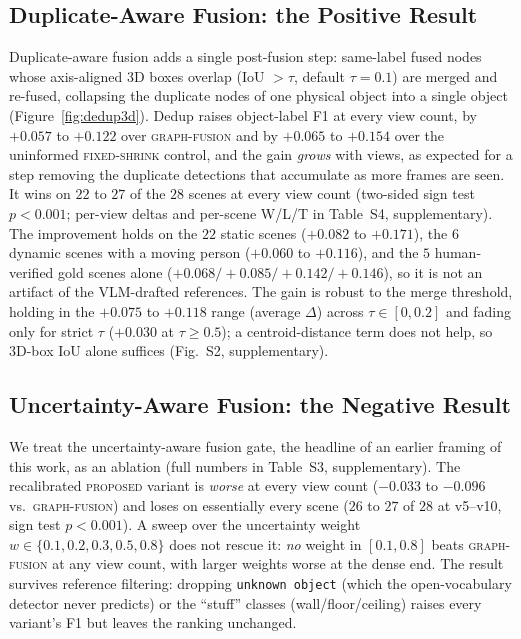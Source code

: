

\subsection{Duplicate-Aware Fusion: the Positive Result}
\label{subsec:dedup}



Duplicate-aware fusion adds a single post-fusion step: same-label fused nodes whose axis-aligned 3D
boxes overlap (IoU $>\tau$, default $\tau{=}0.1$) are merged and re-fused, collapsing the duplicate
nodes of one physical object into a single object (Figure~\ref{fig:dedup3d}). Dedup raises object-label
F1 at every view count, by $+0.057$ to $+0.122$ over \textsc{graph-fusion} and by $+0.065$ to $+0.154$
over the uninformed \textsc{fixed-shrink} control, and the gain \emph{grows} with views, as expected for a
step removing the duplicate detections that accumulate as more frames are seen. It wins on $22$ to $27$ of
the $28$ scenes at every view count (two-sided sign test $p<0.001$; per-view deltas and per-scene W/L/T in
Table~S4, supplementary). The improvement holds on the $22$ static scenes ($+0.082$ to $+0.171$), the $6$
dynamic scenes with a moving person ($+0.060$ to $+0.116$), and the $5$ human-verified gold scenes alone
($+0.068/+0.085/+0.142/+0.146$), so it is not an artifact of the VLM-drafted references. The gain is
robust to the merge threshold, holding in the $+0.075$ to $+0.118$ range (average $\Delta$) across
$\tau\in[0,0.2]$ and fading only for strict $\tau$ ($+0.030$ at $\tau\ge0.5$); a centroid-distance term
does not help, so 3D-box IoU alone suffices (Fig.~S2, supplementary).

\subsection{Uncertainty-Aware Fusion: the Negative Result}
\label{subsec:uncertainty}

We treat the uncertainty-aware fusion gate, the headline of an earlier framing of this work, as an
ablation (full numbers in Table~S3, supplementary). The recalibrated \textsc{proposed} variant is
\emph{worse} at every view count ($-0.033$ to $-0.096$ vs.\ \textsc{graph-fusion}) and loses on
essentially every scene ($26$ to $27$ of $28$ at v5--v10, sign test $p<0.001$). A sweep over the
uncertainty weight $w \in \{0.1, 0.2, 0.3, 0.5, 0.8\}$ does not rescue it: \emph{no} weight in
$[0.1, 0.8]$ beats \textsc{graph-fusion} at any view count, with larger weights worse at the dense end.
The result survives reference filtering: dropping \texttt{unknown object} (which the open-vocabulary
detector never predicts) or the ``stuff'' classes (wall/floor/ceiling) raises every variant's F1 but
leaves the ranking unchanged.

